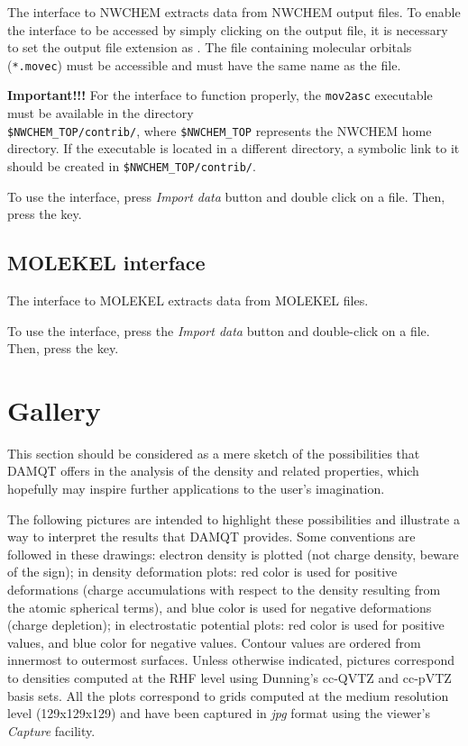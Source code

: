 \documentclass[10pt]{article}
\begin{document}
The interface to NWCHEM extracts data from NWCHEM output files. 
To enable the interface to be accessed by simply clicking on the output file, it is necessary to 
set the output file extension as \nwcout{ }. The file containing molecular orbitals (\texttt{*.movec})
must be accessible and must have the same name as the \nwcout{ } file.

{\bf Important!!!} For the interface to function properly, the \texttt{mov2asc} executable must be available in
the directory \\ \texttt{\$NWCHEM\_TOP/contrib/}, where \texttt{\$NWCHEM\_TOP} represents
the NWCHEM home directory. If the executable is located in a different directory,
a symbolic link to it should be created in \texttt{\$NWCHEM\_TOP/contrib/}.


To use the interface, press {\it Import data} button \teclapuntos and double click
on a \nwcout{ } file. Then, press the \exec key.

\subsection{MOLEKEL interface \label{sec:5.7}}

The interface to MOLEKEL extracts data from MOLEKEL \mkl{ } files.

To use the interface, press the {\it Import data} button \teclapuntos and double-click
on a \mkl{ } file. Then, press the \exec key.




\newpage

\section{Gallery \label{sec:6}}

This section should be considered as a mere sketch of the possibilities that
DAMQT offers in the analysis of the density and related properties, which hopefully may inspire
further applications to the user's imagination.

The following pictures are intended to highlight these possibilities and illustrate a way to interpret the results that DAMQT provides. Some
conventions are followed in these drawings: electron density is plotted (not
charge density, beware of the sign); in density deformation plots:
red color is used for positive deformations (charge accumulations with respect 
to the density resulting from the atomic spherical terms), and blue color is
used for negative deformations (charge depletion); in electrostatic potential plots:
red color is used for positive values, and blue color for negative values.
Contour values are ordered from innermost to outermost surfaces.
Unless otherwise indicated, pictures correspond to densities computed
at the RHF level using Dunning's cc-QVTZ and cc-pVTZ
basis sets\footnotemark{}.
All the plots correspond to grids computed at the medium resolution level
(129x129x129) and have been captured in {\it jpg} format using the viewer’s {\it
Capture} facility.
\end{document}
